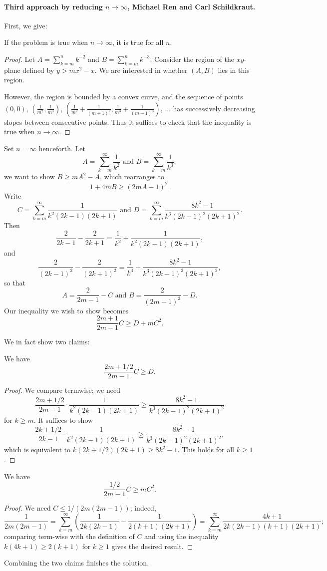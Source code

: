 \paragraph{Third approach by reducing $n \to \infty$, Michael Ren and Carl Schildkraut.}
First, we give:
\begin{claim*}
  If the problem is true when $n \to \infty$, it is true for all $n$.
\end{claim*}
\begin{proof}
  Let $A = \sum_{k=m}^n k^{-2}$ and $B = \sum_{k=m}^n k^{-3}$.
  Consider the region of the $xy$-plane defined by $y > mx^2 - x$.
  We are interested in whether $(A,B)$ lies in this region.

  However, the region is bounded by a convex curve,
  and the sequence of points $(0,0)$,
  $\left( \frac1{m^2},\frac1{m^3} \right)$,
  $\left( \frac1{m^2}+\frac1{(m+1)^2},\frac1{m^3}+\frac1{(m+1)^3} \right)$,
  $\dots$ has successively decreasing slopes between consecutive points.
  Thus it suffices to check that the inequality is true when $n\to\infty$.
\end{proof}

Set $n=\infty$ henceforth.
Let
\[ A=\sum_{k=m}^\infty\frac1{k^2}\text{ and }B=\sum_{k=m}^\infty \frac1{k^3}; \]
we want to show $B\geq mA^2-A$, which rearranges to
\[ 1+4mB\geq (2mA-1)^2. \]
Write
\[ C=\sum_{k=m}^\infty\frac1{k^2(2k-1)(2k+1)}
  \text{ and }D=\sum_{k=m}^\infty \frac{8k^2-1}{k^3(2k-1)^2(2k+1)^2}. \]
Then
\[ \frac2{2k-1}-\frac2{2k+1}=\frac1{k^2}+\frac1{k^2(2k-1)(2k+1)}, \]
and
\[ \frac2{(2k-1)^2}-\frac2{(2k+1)^2}
  = \frac1{k^3}+\frac{8k^2-1}{k^3(2k-1)^2(2k+1)^2}, \]
so that
\[ A=\frac2{2m-1}-C \text{ and } B=\frac2{(2m-1)^2}-D. \]
Our inequality we wish to show becomes
\[ \frac{2m+1}{2m-1}C\geq D+mC^2. \]

We in fact show two claims:
\begin{claim*}
  We have \[ \frac{2m+1/2}{2m-1}C\geq D. \]
\end{claim*}
\begin{proof}
  We compare termwise; we need
  \[ \frac{2m+1/2}{2m-1}\cdot \frac1{k^2(2k-1)(2k+1)}
    \geq \frac{8k^2-1}{k^3(2k-1)^2(2k+1)^2} \]
  for $k\geq m$. It suffices to show
  \[ \frac{2k+1/2}{2k-1}\cdot \frac1{k^2(2k-1)(2k+1)}
    \geq \frac{8k^2-1}{k^3(2k-1)^2(2k+1)^2}, \]
  which is equivalent to $k(2k+1/2)(2k+1)\geq 8k^2-1$.
  This holds for all $k\geq 1$.
\end{proof}
\begin{claim*}
  We have \[ \frac{1/2}{2m-1}C\geq mC^2. \]
\end{claim*}
\begin{proof}
  We need $C\leq 1/(2m(2m-1))$; indeed,
  \[ \frac1{2m(2m-1)}
    = \sum_{k=m}^\infty\left(\frac1{2k(2k-1)} - \frac1{2(k+1)(2k+1)}\right)
    = \sum_{k=m}^\infty\frac{4k+1}{2k(2k-1)(k+1)(2k+1)}; \]
  comparing term-wise with the definition of $C$ and
  using the inequality $k(4k+1)\geq 2(k+1)$ for $k\geq 1$
  gives the desired result.
\end{proof}
Combining the two claims finishes the solution.

